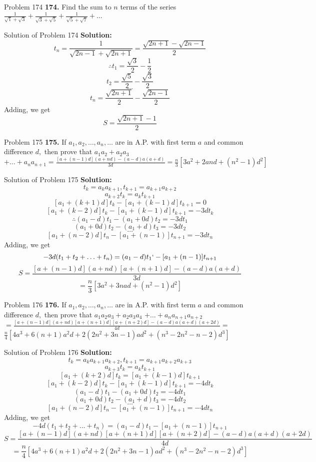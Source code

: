 \documentclass[aspectratio=1610,8pt]{beamer}
\begin{document}
\begin{frame}{Problem 174}
  \textbf{174.} Find the sum to $n$ terms of the series $\frac{1}{\sqrt{1} + \sqrt{3}} + \frac{1}{\sqrt{3} + \sqrt{5}} +
  \frac{1}{\sqrt{5} + \sqrt{7}} + \ldots$
\end{frame}
\begin{frame}{Solution of Problem 174}
  \textbf{Solution:} $$t_n = \frac{1}{\sqrt{2n - 1} + \sqrt{2n + 1}} = \frac{\sqrt{2n + 1} - \sqrt{2n - 1}}{2}$$
  $$\therefore t_1 = \frac{\sqrt{3}}{2} - \frac{1}{2}$$
  $$t_2 = \frac{\sqrt{5}}{2} - \frac{\sqrt{3}}{2}$$
  $$\ldots$$
  $$t_n = \frac{\sqrt{2n + 1}}{2} - \frac{\sqrt{2n - 1}}{2}$$
  Adding, we get
  $$S = \frac{\sqrt{2n + 1} - 1}{2}$$
\end{frame}
\begin{frame}{Problem 175}
  \textbf{175.} If $a_1, a_2, \ldots, a_n, \ldots$ are in A.P. with first term $a$ and common difference $d,$ then prove that
  $a_1a_2 + a_2a_3$ $+ \ldots + a_na_{n +1} = \frac{[a + (n - 1)d](a + nd) - (a - d)a(a + d)}{3d} = \frac{n}{3}[3a^2 + 2and + (n^2
    - 1)d^2]$
\end{frame}
\begin{frame}{Solution of Problem 175}
  \textbf{Solution:} $$t_k = a_ka_{k + 1}, t_{k + 1} = a_{k +1}a_{k + 2}$$
  $$a_{k + 2}t_k = a_kt_{k + 1}$$
  $$[a_1 + (k + 1)d]t_k - [a_1 + (k - 1)d]t_{k + 1} = 0$$
  $$[a_1 + (k - 2)d]t_k - [a_1 + (k - 1)d]t_{k + 1} = -3dt_k$$
  $$\therefore (a_1 - d)t_1 - (a_1 + 0d)t_2 = -3dt_1$$
  $$(a_1 + 0d)t_2 - (a_1 + d)t_3 = -3dt_2$$
  $$\ldots$$
  $$[a_1 + (n - 2)d]t_n - [a_1+(n - 1)]t_{n + 1} = -3dt_n$$
  Adding, we get
  $$-3d(t_1 + t_2 + \ldots + t_n) = (a_1 -d)t_1` - [a_1+(n - 1)]t_{n + 1}$$
  $$S = \frac{[a + (n - 1)d](a + nd)[a + (n + 1)d] - (a - d)a(a + d)}{3d}$$
  $$= \frac{n}{3}[3a^2 + 3nad + (n^2 - 1)d^2]$$
\end{frame}
\begin{frame}{Problem 176}
  \textbf{176.} If $a_1, a_2, \ldots, a_n, \ldots$ are in A.P. with first term $a$ and common difference $d,$ then prove that
  $a_1a_2a_3 + a_2a_3a_4$ $+ \ldots + a_na_{n +1}a_{n + 2}$ $= \frac{[a + (n - 1)d](a + nd)[a + (n + 1)d][a + (n + 2)d] - (a -
    d)a(a + d)(a + 2d)}{4d}=$ $\frac{n}{4}[4a^3 + 6(n + 1)a^2d + 2(2n^2 + 3n - 1)ad^2 + (n^3 - 2n^2 - n - 2)d^3]$
\end{frame}
\begin{frame}{Solution of Problem 176}
  \textbf{Solution:} $$t_k = a_ka_{k+1}a_{k+2}, t_{k+1}=a_{k+1}a_{k+2}a_{k+3}$$
  $$a_{k+3}t_k = a_kt_{k+1}$$
  $$[a_1 + (k + 2)d]t_k = [a_1 + (k - 1)d]t_{k + 1}$$
  $$[a_1 + (k - 2)d]t_k - [a_1 + (k - 1)d]t_{k+1} = -4dt_k$$
  $$(a_1 - d)t_1 - (a_1 + 0d)t_2 = -4dt_1$$
  $$(a_1 + 0d)t_2 - (a_1 + d)t_3 = -4dt_2$$
  $$\ldots$$
  $$[a_1 + (n - 2)d]t_n - [a_1+(n - 1)]t_{n + 1} = -4dt_n$$
  Adding, we get
  $$-4d(t_1 + t_2 + \ldots + t_n) = (a_1 - d)t_1 - [a_1 + (n - 1)]t_{n + 1}$$
  $$S = \frac{[a + (n - 1)d](a + nd)[a + (n + 1)d][a + (n + 2)d] - (a - d)a(a + d)(a + 2d)}{4d}$$
  $$= \frac{n}{4}[4a^3 + 6(n + 1)a^2d + 2(2n^2 + 3n - 1)ad^2 + (n^3 - 2n^2 - n - 2)d^3]$$
\end{frame}
\end{document}
